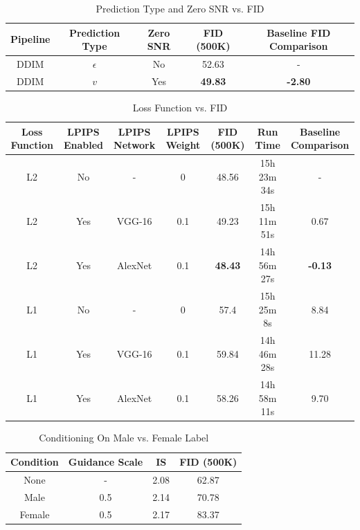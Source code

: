 \documentclass[conference]{IEEEtran}
\begin{document}
\begin{table}[H]
    \centering
    \caption{Prediction Type and Zero SNR vs. FID}
    \label{tab:scheduler_table6}
    \begin{tabular}{ccccc}
    \hline
        Pipeline & Prediction Type & Zero SNR & FID (500K) & Baseline FID Comparison \\
        \hline
        \hline
        DDIM  & $\epsilon$ & No & 52.63 & - \\
        \hline
        DDIM & $v$ & Yes & \textbf{49.83} & \textbf{-2.80} \\ \hline
    \end{tabular}
\end{table}

\begin{table}[!ht]
    \centering
    \caption{Loss Function vs. FID}
    \label{tab:loss_table}
    \begin{tabular}{ccccccc}
    \hline
        Loss Function & LPIPS Enabled & LPIPS Network & LPIPS Weight & FID (500K) & Run Time & Baseline Comparison \\ \hline
        \hline
        L2 & No & - & 0 & 48.56 & 15h 23m 34s & - \\
        \hline
        L2 & Yes & VGG-16 & 0.1 & 49.23 & 15h 11m 51s & 0.67 \\ 
        L2 & Yes & AlexNet & 0.1 & \textbf{48.43} & 14h 56m 27s & \textbf{-0.13} \\ 
        L1 & No & - & 0 & 57.4 & 15h 25m 8s & 8.84 \\ 
        L1 & Yes & VGG-16 & 0.1 & 59.84 & 14h 46m 28s & 11.28 \\ 
        L1 & Yes & AlexNet & 0.1 & 58.26 & 14h 58m 11s & 9.70 \\ \hline
    \end{tabular}
\end{table}

\begin{table}[H]
    \centering
    \caption{Conditioning On Male vs. Female Label}
    \label{tab:conditioning_table}
    \begin{tabular}{cccc}  
    \hline
        Condition & Guidance Scale & IS & FID (500K) \\
        \hline
        \hline
        None & - & 2.08& 62.87 \\ 
        \hline
        Male & 0.5 & 2.14& 70.78 \\ 
        Female & 0.5 & 2.17 & 83.37 \\ \hline
    \end{tabular}
\end{table}
\end{document}
